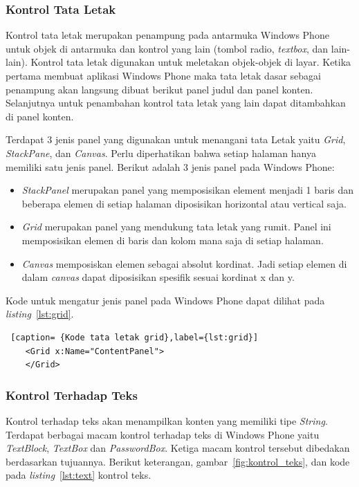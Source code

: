 \newpage
\subsubsection{Kontrol Tata Letak}
\label{subsubsec:Kontrol Tata Letak}
\hspace{0.5cm} Kontrol tata letak merupakan penampung pada antarmuka Windows Phone untuk objek di antarmuka dan kontrol yang lain (tombol radio, \textit{textbox}, dan lain-lain). Kontrol tata letak digunakan untuk meletakan objek-objek di layar. Ketika pertama membuat aplikasi Windows Phone maka tata letak dasar sebagai penampung akan langsung dibuat berikut panel judul dan panel konten. Selanjutnya untuk penambahan kontrol tata letak yang lain dapat ditambahkan di panel konten.


Terdapat 3 jenis panel yang digunakan untuk menangani tata Letak yaitu \textit{Grid}, \textit{StackPane}, dan \textit{Canvas}. Perlu diperhatikan bahwa setiap halaman hanya memiliki satu jenis panel. Berikut adalah 3 jenis panel pada Windows Phone:

\begin{itemize}
	\item \textit{StackPanel} merupakan panel yang memposisikan element menjadi 1 baris dan beberapa elemen di setiap halaman diposisikan horizontal atau vertical saja.
	\item \textit{Grid} merupakan panel yang mendukung tata letak yang rumit. Panel ini memposisikan elemen di baris dan kolom mana saja di setiap halaman.
	\item \textit{Canvas} memposiskan elemen sebagai absolut kordinat. Jadi setiap elemen di dalam \textit{canvas} dapat diposisikan spesifik sesuai kordinat x dan y.
\end{itemize}

Kode untuk mengatur jenis panel pada Windows Phone dapat dilihat pada \textit{listing}~\ref{lst:grid}.
\begin{lstlisting} [caption= {Kode tata letak grid},label={lst:grid}]
	<Grid x:Name="ContentPanel">
	</Grid>
\end{lstlisting}
	
\subsubsection{Kontrol Terhadap Teks}
\label{subsubsec:Kontrol Terhadap Teks}
\hspace{0.5cm} Kontrol terhadap teks  akan menampilkan konten yang memiliki tipe \textit{String}. Terdapat berbagai macam kontrol terhadap teks di Windows Phone yaitu \textit{TextBlock}, \textit{TextBox} dan \textit{PasswordBox}. Ketiga macam kontrol tersebut dibedakan berdasarkan tujuannya. Berikut keterangan, gambar~\ref{fig:kontrol_teks}, dan kode pada \textit{listing}~\ref{lst:text} kontrol teks.

